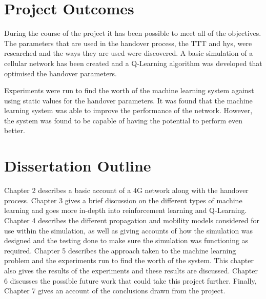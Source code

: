 \section{Project Outcomes}
During the course of the project it has been possible to meet all of the objectives. The parameters that are used in the handover process, the \ac{TTT} and \ac{hys}, were researched and the ways they are used were discovered. A basic simulation of a cellular network has been created and a Q-Learning algorithm was developed that optimised the handover parameters.

Experiments were run to find the worth of the machine learning system against using static values for the handover parameters. It was found that the machine learning system was able to improve the performance of the network. However, the system was found to be capable of having the potential to perform even better.   
\section{Dissertation Outline}
Chapter 2 describes a basic account of a 4G network along with the handover process. Chapter 3 gives a brief discussion on the different types of machine learning and goes more in-depth into reinforcement learning and Q-Learning. Chapter 4 describes the different propagation and mobility models considered for use within the simulation, as well as giving accounts of how the simulation was designed and the testing done to make sure the simulation was functioning as required. Chapter 5 describes the approach taken to the machine learning problem and the experiments run to find the worth of the system. This chapter also gives the results of the experiments and these results are discussed. Chapter 6 discusses the possible future work that could take this project further. Finally, Chapter 7 gives an account of the conclusions drawn from the project.